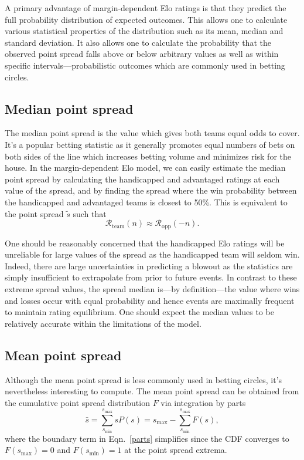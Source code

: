 \documentclass[aps,prc,reprint,amsmath,superscriptaddress,nofootinbib]{revtex4-1}
\newcommand{\R}{\mathcal{R}}
\begin{document}
A primary advantage of margin-dependent Elo ratings is that they predict the full probability distribution of expected outcomes.
This allows one to calculate various statistical properties of the distribution such as its mean, median and standard deviation.
It also allows one to calculate the probability that the observed point spread falls above or below arbitrary values as well as within specific intervals---probabilistic outcomes which are commonly used in betting circles.

\subsection{Median point spread}

The median point spread is the value which gives both teams equal odds to cover.
It's a popular betting statistic as it generally promotes equal numbers of bets on both sides of the line which increases betting volume and minimizes risk for the house.
In the margin-dependent Elo model, we can easily estimate the median point spread by calculating the handicapped and advantaged ratings at each value of the spread, and by finding the spread where the win probability between the handicapped and advantaged teams is closest to 50\%.
This is equivalent to the point spread $\tilde{s}$ such that
\begin{equation}
  \R_\text{team}(n) \approx \R_\text{opp}(-n).
\end{equation}

One should be reasonably concerned that the handicapped Elo ratings will be unreliable for large values of the spread as the handicapped team will seldom win.
Indeed, there are large uncertainties in predicting a blowout as the statistics are simply insufficient to extrapolate from prior to future events.
In contrast to these extreme spread values, the spread median is---by definition---the value where wins and losses occur with equal probability and hence events are maximally frequent to maintain rating equilibrium.
One should expect the median values to be relatively accurate within the limitations of the model.

\subsection{Mean point spread}

Although the mean point spread is less commonly used in betting circles, it's nevertheless interesting to compute.
The mean point spread can be obtained from the cumulative point spread distribution $F$ via integration by parts
\begin{equation}
  \label{parts}
  \bar{s} = \sum\limits_{s_\text{min}}^{s_\text{max}} s P(s) = s_\text{max} - \sum\limits_{s_\text{min}}^{s_\text{max}} F(s),
\end{equation}
where the boundary term in Eqn.~\eqref{parts} simplifies since the CDF converges to $F(s_\text{max})=0$ and $F(s_\text{min})=1$ at the point spread extrema.
\end{document}
